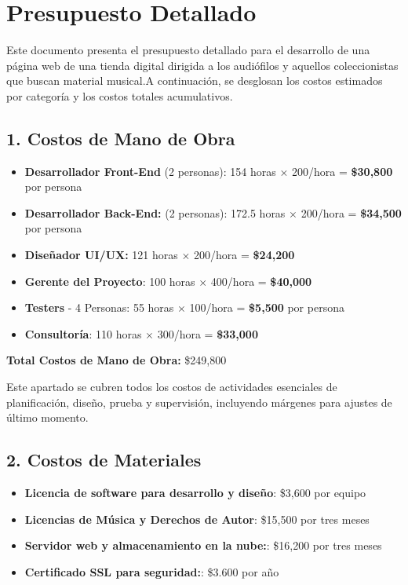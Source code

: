 \documentclass[12pt]{article}
\begin{document}
 \section*{Presupuesto Detallado}
    
Este documento presenta el presupuesto detallado para el desarrollo de una página web de una tienda digital dirigida a los audiófilos y aquellos coleccionistas que buscan material musical.A continuación, se desglosan los costos estimados por categoría y los costos totales acumulativos.

\subsection*{1. Costos de Mano de Obra}
\begin{itemize}
    \item \textbf{Desarrollador Front-End} (2 personas): 154 horas $\times$ 200/hora = \textbf{\$30,800} por persona
    \item \textbf{Desarrollador Back-End:} (2 personas): 172.5 horas $\times$ 200/hora = \textbf{\$34,500} por persona
    \item \textbf{Diseñador UI/UX:} 121 horas $\times$ 200/hora = \textbf{\$24,200}
    \item \textbf{Gerente del Proyecto}: 100 horas $\times$ 400/hora = \textbf{\$40,000}
    \item \textbf{Testers} - 4 Personas: 55 horas $\times$ 100/hora = \textbf{\$5,500} por persona
    \item \textbf{Consultoría}: 110 horas $\times$ 300/hora = \textbf{\$33,000}
\end{itemize}

\textbf{Total Costos de Mano de Obra:} \$249,800

Este apartado se cubren todos los costos de actividades esenciales de planificación, diseño, prueba y supervisión, incluyendo márgenes para ajustes de último momento.

\subsection*{2. Costos de Materiales}
\begin{itemize}
    \item \textbf{Licencia de software para desarrollo y diseño}: \$3,600 por equipo
    \item \textbf{Licencias de Música y Derechos de Autor}: \$15,500 por tres meses
    \item \textbf{Servidor web y almacenamiento en la nube:}:  \$16,200 por tres meses
    \item \textbf{Certificado SSL para seguridad:}: \$3.600 por año
\end{itemize}
\end{document}
